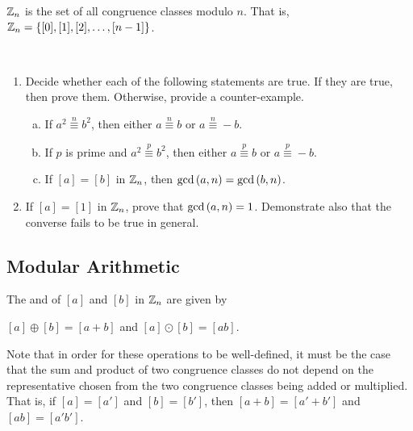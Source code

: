 \documentclass[11pt,fleqn,dvipsnames,usenames]{article}
\newcommand{\p}{\noindent}
\begin{document}
%
\begin{definition}
$\mathbb{Z}_{n}$ is the set of all congruence classes modulo $n$.  That is, $\mathbb{Z}_{n} = \left\{[0], [1], [2],\ldots, [n-1]\right\}$.
\end{definition}
%
\begin{exercises}~
\begin{enumerate}
\item Decide whether each of the following statements are true.  If they are true, then prove them.  Otherwise, provide a counter-example.
\begin{enumerate}[(a)]
\item If $a^2\overset{n}{\equiv}b^2$, then either $a\overset{n}{\equiv}b$ or $a\overset{n}{\equiv}-b$.
\item If $p$ is prime and $a^2\overset{p}{\equiv}b^2$, then either $a\overset{p}{\equiv}b$ or $a\overset{p}{\equiv}-b$.
\item If $[a] = [b]$ in $\mathbb{Z}_{n}$, then $\text{gcd}\left(a,n\right) = \text{gcd}\left(b,n\right)$.
\end{enumerate}
\item If $[a] = [1]$ in $\mathbb{Z}_{n}$, prove that $\text{gcd}\left(a,n\right) = 1$.  Demonstrate also that the converse fails to be true in general.
\end{enumerate}
\end{exercises}
%
\subsection{Modular Arithmetic}
\begin{definition}
The  and  of $[a]$ and $[b]$ in $\mathbb{Z}_{n}$ are given by
\begin{center}
$[a]\oplus [b] = [a + b]$ and $[a]\odot[b] = [ab]$.
\end{center}
\end{definition}
%
\p Note that in order for these operations to be well-defined, it must be the case that the sum and product of two congruence classes do not depend on the representative chosen from the two congruence classes being added or multiplied.  That is, if $[a] = [a']$ and $[b] = [b']$, then $[a+b] = [a' + b']$ and $[ab] = [a'b']$.
\smsp
\end{document}
